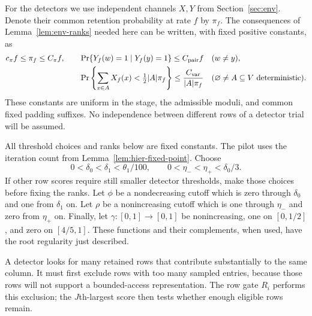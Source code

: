 For the detectors we use independent channels $X,Y$ from
Section~\ref{sec:env}.  Denote their common retention probability at rate
$f$ by $\pi_f$.  The consequences of Lemma~\ref{lem:env-ranks} needed here
can be written, with fixed positive constants, as
\begin{align}
 c_\pi f\leq\pi_f\leq C_\pi f,\qquad
 &\Pr\{Y_f(w)=1\mid Y_f(y)=1\}\leq C_{\rm pair} f
       &&(w\ne y), \label{eq:hier-sampling-pair}\\
 &\Pr\left\{\sum_{x\in A}X_f(x)<\tfrac12|A|\pi_f\right\}
       \leq\frac{C_{\rm var}}{|A|\pi_f}
       &&(\varnothing\ne A\subseteq V\text{ deterministic}).
       \label{eq:hier-sampling-tail}
\end{align}
These constants are uniform in the stage, the admissible moduli, and common
fixed padding suffixes.  No independence between different rows of a
detector trial will be assumed.

All threshold choices and ranks below are fixed constants.  The pilot
uses the iteration count from Lemma~\ref{lem:hier-fixed-point}.  Choose
\[
 0<\delta_0<\delta_1<\theta_1/100,
 \qquad 0<\eta_-<\eta_+<\delta_0/3.
\]
If other row scores require still smaller detector thresholds, make those
choices before fixing the ranks.  Let $\phi$ be a nondecreasing cutoff
which is zero through $\delta_0$ and one from $\delta_1$ on.  Let $\rho$
be a nonincreasing cutoff which is one through $\eta_-$ and zero from
$\eta_+$ on.  Finally, let $\gamma:[0,1]\to[0,1]$ be nonincreasing,
one on $[0,1/2]$, and zero on $[4/5,1]$.  These functions and their
complements, when used, have the root regularity just described.

A detector looks for many retained rows that contribute substantially to the same column. It must first exclude rows with too many sampled entries, because those rows will not support a bounded-access representation. The row gate $R_i$ performs this exclusion; the $J$th-largest score then tests whether enough eligible rows remain.

